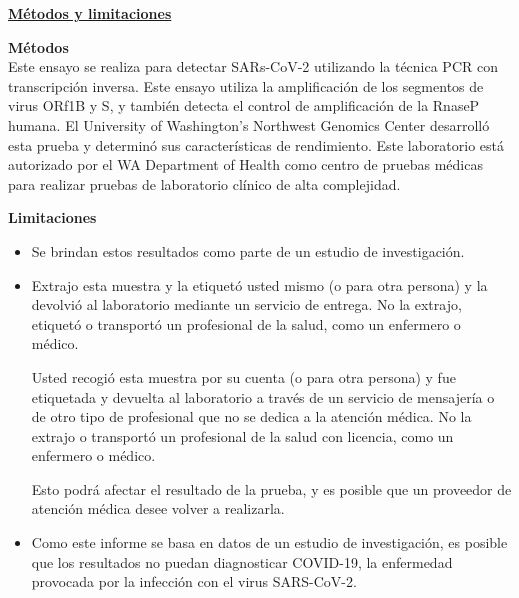 \documentclass[10pt]{article}
\begin{document}
\bigskip

\large \underline{\textbf{Métodos y limitaciones}}

\textbf{Métodos}\\
Este ensayo se realiza para detectar SARs-CoV-2 utilizando la técnica PCR con
transcripción inversa. Este ensayo utiliza la amplificación de los segmentos de
virus ORf1B y S, y también detecta el control de amplificación de la RnaseP
humana. El University of Washington’s Northwest Genomics Center desarrolló esta
prueba y determinó sus características de rendimiento. Este laboratorio está
autorizado por el WA Department of Health como centro de pruebas médicas para
realizar pruebas de laboratorio clínico de alta complejidad.

\textbf{Limitaciones}

\begin{itemize}

\item

  Se brindan estos resultados como parte de un estudio de investigación.

\item

  Extrajo esta muestra y la etiquetó usted mismo (o para otra persona) y la
  devolvió al laboratorio mediante un servicio de entrega. No la extrajo,
  etiquetó o transportó un profesional de la salud, como un enfermero o médico.

  Usted recogió esta muestra por su cuenta (o para otra persona) y fue etiquetada
  y devuelta al laboratorio a través de un servicio de mensajería o de otro
  tipo de profesional que no se dedica a la atención médica.  No la extrajo o
  transportó un profesional de la salud con licencia, como un enfermero o
  médico.



  Esto podrá afectar el resultado de la prueba, y es posible que un proveedor de
  atención médica desee volver a realizarla.

\item

  Como este informe se basa en datos de un estudio de investigación, es posible
  que los resultados no puedan diagnosticar COVID-19, la enfermedad provocada
  por la infección con el virus SARS-CoV-2.

\end{itemize}
\end{document}
